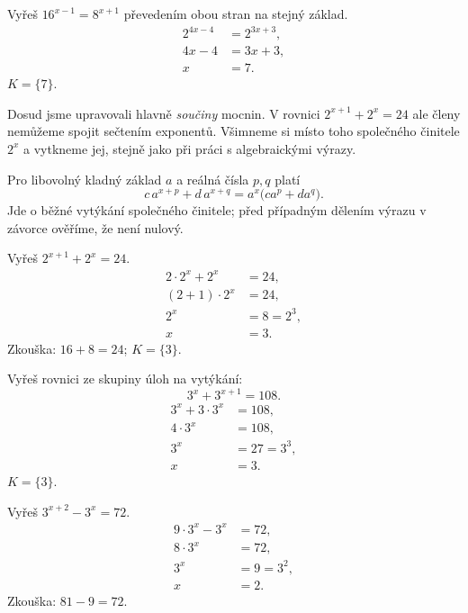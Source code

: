 \documentclass[11pt,a4paper]{article}
\begin{document}
\begin{prikladReseniBox}[title={Příklad 1}]
Vyřeš $16^{x-1}=8^{x+1}$ převedením obou stran na stejný základ.
\tcblower
\[
\begin{aligned}
2^{4x-4}&=2^{3x+3},\\
4x-4&=3x+3,\\
x&=7.
\end{aligned}
\]
$K=\{7\}$.
\end{prikladReseniBox}
Dosud jsme upravovali hlavně \emph{součiny} mocnin. V rovnici $2^{x+1}+2^x=24$ ale členy nemůžeme spojit sečtením exponentů. Všimneme si místo toho společného činitele $2^x$ a vytkneme jej, stejně jako při práci s algebraickými výrazy.
\begin{zadaniBox}[title={Věta - Vytýkání stejné exponenciální mocniny}]
Pro libovolný kladný základ $a$ a reálná čísla $p,q$ platí
\[
c\,a^{x+p}+d\,a^{x+q}=a^x\bigl(ca^p+da^q\bigr).
\]
Jde o běžné vytýkání společného činitele; před případným dělením výrazu v závorce ověříme, že není nulový.
\end{zadaniBox}
\begin{prikladReseniBox}[title={Příklad 2}]
Vyřeš $2^{x+1}+2^x=24$.
\tcblower
\[
\begin{aligned}
2\cdot2^x+2^x&=24,\\
(2+1)\cdot2^x&=24,\\
2^x&=8=2^3,\\
x&=3.
\end{aligned}
\]
Zkouška: $16+8=24$; $K=\{3\}$.
\end{prikladReseniBox}
\begin{prikladReseniBox}[title={Příklad 3}]
Vyřeš rovnici ze skupiny úloh na vytýkání:
\[3^x+3^{x+1}=108.\]
\tcblower
\[
\begin{aligned}
3^x+3\cdot3^x&=108,\\
4\cdot3^x&=108,\\
3^x&=27=3^3,\\
x&=3.
\end{aligned}
\]
$K=\{3\}$.
\end{prikladReseniBox}
\begin{prikladReseniBox}[title={Příklad 4}]
Vyřeš $3^{x+2}-3^x=72$.
\tcblower
\[
\begin{aligned}
9\cdot3^x-3^x&=72,\\
8\cdot3^x&=72,\\
3^x&=9=3^2,\\
x&=2.
\end{aligned}
\]
Zkouška: $81-9=72$.
\end{prikladReseniBox}
\end{document}
